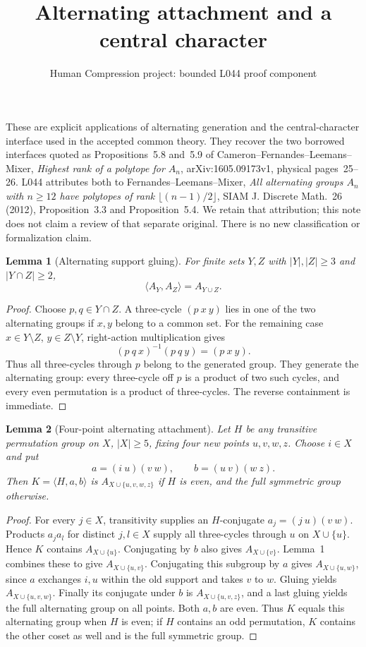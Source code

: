 \documentclass[11pt,a4paper]{article}
\title{Alternating attachment and a central character}
\author{Human Compression project: bounded L044 proof component}
\date{}
\newtheorem{lemma}{Lemma}
\newcommand{\gen}[1]{\langle#1\rangle}
\begin{document}
\maketitle
These are explicit applications of alternating generation and the
central-character interface used in the accepted common theory.
They recover the two borrowed interfaces quoted as Propositions~5.8
and~5.9 of Cameron--Fernandes--Leemans--Mixer,
\emph{Highest rank of a polytope for $A_n$},
arXiv:1605.09173v1, physical pages~25--26. L044 attributes both to Fernandes--Leemans--Mixer,
\emph{All alternating groups $A_n$ with $n\geq12$ have polytopes
of rank $\lfloor(n-1)/2\rfloor$}, SIAM J. Discrete Math.~26 (2012),
Proposition~3.3 and Proposition~5.4. We retain that attribution;
this note does not claim a review of that separate original.
There is no new classification or formalization claim.

\begin{lemma}[Alternating support gluing]
For finite sets $Y,Z$ with $|Y|,|Z|\geq3$ and $|Y\cap Z|\geq2$,
\[
                    \gen{A_Y,A_Z}=A_{Y\cup Z}.
\]
\end{lemma}
\begin{proof}
Choose $p,q\in Y\cap Z$. A three-cycle $(p\ x\ y)$ lies in one
of the two alternating groups if $x,y$ belong to a common set.
For the remaining case $x\in Y\setminus Z$, $y\in Z\setminus Y$,
right-action multiplication gives
\[
                (p\ q\ x)^{-1}(p\ q\ y)=(p\ x\ y).
\]
Thus all three-cycles through $p$ belong to the generated group.
They generate the alternating group: every three-cycle off $p$
is a product of two such cycles, and every even permutation is a
product of three-cycles. The reverse containment is immediate.
\end{proof}

\begin{lemma}[Four-point alternating attachment]
Let $H$ be any transitive permutation group on $X$, $|X|\geq5$,
fixing four new points $u,v,w,z$. Choose $i\in X$ and put
\[
               a=(i\ u)(v\ w),\qquad b=(u\ v)(w\ z).
\]
Then $K=\gen{H,a,b}$ is $A_{X\cup\{u,v,w,z\}}$ if $H$ is even,
and the full symmetric group otherwise.
\end{lemma}
\begin{proof}
For every $j\in X$, transitivity supplies an $H$-conjugate
$a_j=(j\ u)(v\ w)$. Products $a_j a_l$ for distinct $j,l\in X$
supply all three-cycles
through $u$ on $X\cup\{u\}$. Hence $K$ contains
$A_{X\cup\{u\}}$. Conjugating by $b$ also gives
$A_{X\cup\{v\}}$. Lemma~1 combines these to give
$A_{X\cup\{u,v\}}$.
Conjugating this subgroup by $a$ gives
$A_{X\cup\{u,w\}}$, since $a$ exchanges $i,u$ within the old
support and takes $v$ to $w$. Gluing yields
$A_{X\cup\{u,v,w\}}$. Finally its conjugate under $b$ is
$A_{X\cup\{u,v,z\}}$, and a last gluing yields the full
alternating group on all points. Both $a,b$ are even. Thus
$K$ equals this alternating group when $H$ is even; if $H$
contains an odd permutation, $K$ contains the other coset as well
and is the full symmetric group.
\end{proof}
\end{document}
